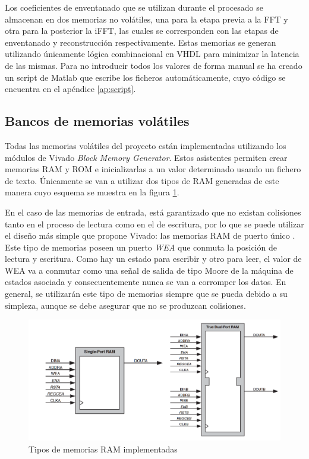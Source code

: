 Los coeficientes de enventanado que se utilizan durante el procesado se almacenan en dos memorias no volátiles, una para la etapa previa a la FFT y otra para la posterior la iFFT, las cuales se corresponden con las etapas de enventanado y reconstrucción respectivamente. Estas memorias se generan utilizando únicamente lógica combinacional en VHDL para minimizar la latencia de las mismas. Para no introducir todos los valores de forma manual se ha creado un script de Matlab que escribe los ficheros automáticamente, cuyo código se encuentra en el apéndice \ref{ap:script}.

\subsection{Bancos de memorias volátiles\label{memo}}
Todas las memorias volátiles del proyecto están implementadas utilizando los módulos de Vivado \emph{Block Memory Generator}. Estos asistentes permiten crear memorias RAM y ROM e inicializarlas a un valor determinado usando un fichero de texto. Únicamente se van a utilizar dos tipos de RAM generadas de este manera cuyo esquema se muestra  en la figura \ref{fig:rams}.

En el caso de las memorias de entrada, está garantizado que no existan colisiones tanto en el proceso de lectura como en el de escritura, por lo que se puede utilizar el diseño más simple que propone Vivado: las memorias RAM de puerto único \cite{ram}. Este tipo de memorias poseen un puerto \emph{WEA} que conmuta la posición de lectura y escritura. Como hay un estado para escribir y otro para leer, el valor de WEA va a conmutar como una señal de salida de tipo Moore de la máquina de estados asociada y consecuentemente nunca se van a corromper los datos. En general, se utilizarán este tipo de memorias siempre que se pueda debido a su simpleza, aunque se debe asegurar que no se produzcan colisiones.

\begin{figure}[!b]
\begin{center}
\includegraphics[width=12cm]{img/rams.png}
\caption{\label{fig:rams}Tipos de memorias RAM implementadas}
\end{center}
\end{figure}

